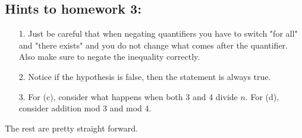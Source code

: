 \documentclass[letterpaper,12pt]{article}
\begin{document}
\subsection*{Hints to homework 3:}
\begin{enumerate}
\item[1.] Just be careful that when negating quantifiers you have to switch "for all" and "there exists" and you do not change what comes after the quantifier. Also make sure to negate the inequality correctly.
\item[2.] Notice if the hypothesis is false, then the statement is always true.
\item[3.] For (c), consider what happens when both 3 and 4 divide $n$. For (d), consider addition mod 3 and mod 4.
\end{enumerate}
The rest are pretty straight forward.
\end{document}
